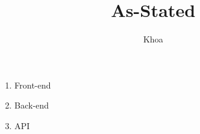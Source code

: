 \documentclass[11pt]{article}
\title{\LARGE As-Stated}
\author{Khoa}
\begin{document}
    \maketitle
    \begin{multicols}{2}
        \begin{enumerate}
            \item Front-end
            \item Back-end
            \item API
        \end{enumerate}
    \end{multicols}
\end{document}
